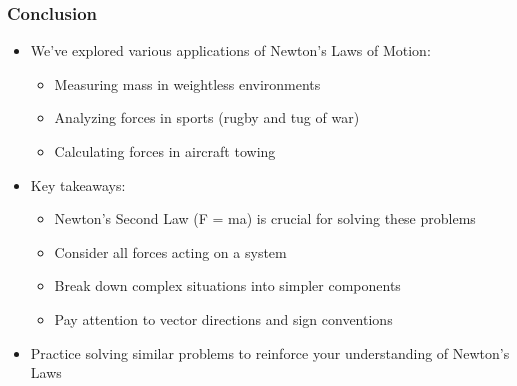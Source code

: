 \documentclass{beamer}
\begin{document}
\begin{frame}

\frametitle{Conclusion}
\begin{itemize}
\item We've explored various applications of Newton's Laws of Motion:
\begin{itemize}
\item Measuring mass in weightless environments
\item Analyzing forces in sports (rugby and tug of war)
\item Calculating forces in aircraft towing
\end{itemize}
\item Key takeaways:
\begin{itemize}
\item Newton's Second Law (F = ma) is crucial for solving these problems
\item Consider all forces acting on a system
\item Break down complex situations into simpler components
\item Pay attention to vector directions and sign conventions
\end{itemize}
\item Practice solving similar problems to reinforce your understanding of Newton's Laws
\end{itemize}
\end{frame}
\end{document}
